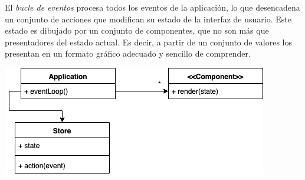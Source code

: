  El  \textit{bucle de eventos} procesa todos los eventos de la aplicación, lo que desencadena un conjunto de acciones que modifican su estado de la interfaz de usuario. Este estado es dibujado por un conjunto de componentes, que no son más que presentadores del estado actual. Es decir, a partir de un conjunto de valores los presentan en un formato gráfico adecuado y sencillo de comprender.

\vspace{5mm}
\begin{minipage}[h]{0.8\linewidth}
	\centering
	\includegraphics[width=\linewidth]{assets/ui}
	\label{img:ui}
\end{minipage}

\label{sec:ui}